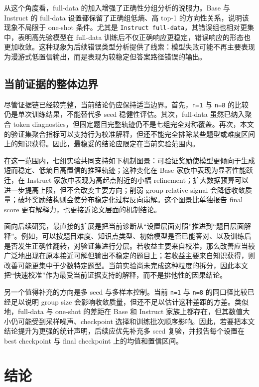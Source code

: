 \documentclass[12pt,a4paper]{ctexart}
\begin{document}
从这个角度看，full-data 的加入增强了正确性分组分析的说服力。Base 与 Instruct 的 full-data 设置都保留了正确组低熵、高 top-1 的方向性关系，说明该现象不局限于 one-shot 条件。尤其是 \texttt{Instruct full-data}，其错误组也相对更集中，表明高先验模型在 full-data 训练后不仅正确响应更稳定，错误响应的形态也更加收敛。这种现象为后续错误类型分析提供了线索：模型失败可能不再主要表现为漫游式低置信输出，而是表现为较稳定但答案路径错误的输出。

\subsection{当前证据的整体边界}

尽管证据链已经较完整，当前结论仍应保持适当边界。首先，\texttt{n=1} 与 \texttt{n=8} 的比较仍是单次训练结果，不能替代多 seed 稳健性评估。其次，full-data 虽然已纳入聚合 token diagnostics，但固定题目完整轨迹仍不是七组完全对称覆盖。再次，本文的验证集聚合指标可以支持行为校准解释，但还不能完全排除某些题型或难度区间上的知识获得。因此，最稳妥的结论应限定在当前实验范围内。

在这一范围内，七组实验共同支持如下机制图景：可验证奖励使模型更倾向于生成短而稳定、低熵且高置信的推理轨迹；这种变化在 Base 家族中表现为显著性能跃迁，在 Instruct 家族中表现为高起点附近的小幅 refinement；扩大数据预算可以进一步提高上限，但不会改变主要方向；削弱 group-relative signal 会降低收敛质量；破坏奖励结构则会使分布稳定化过程反向崩解。这个图景比单独报告 final score 更有解释力，也更接近论文层面的机制结论。

面向后续研究，最直接的扩展是把当前诊断从“设置层面对照”推进到“题目层面解释”。例如，可以按题目难度、知识点类型、初始模型是否已能答对、以及训练后是否发生正确性翻转，对验证集进行分层。若收益主要来自校准，那么改善应当较广泛地出现在原本接近可解但输出不稳定的题目上；若收益主要来自知识获得，则改善可能更集中于少数特定题型。当前实验尚未完成这种粒度的拆分，因此本文把“快速校准”作为最受当前证据支持的解释，而不是排他性的因果结论。

另一个值得补充的方向是多 seed 与多样本控制。当前 \texttt{n=1} 与 \texttt{n=8} 的同口径比较已经足以说明 group size 会影响收敛质量，但还不足以估计这种差距的方差。类似地，full-data 与 one-shot 的差距在 Base 和 Instruct 家族上都存在，但其数值大小仍可能受到采样噪声、checkpoint 选择和训练批次顺序影响。因此，若要把本文结论提升为更强的统计声明，后续应优先补充多 seed 复验，并报告每个设置在 best checkpoint 与 final checkpoint 上的均值和置信区间。

\clearpage
\section{结论}
\end{document}
